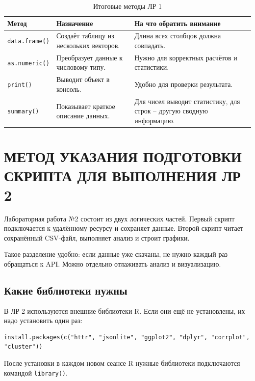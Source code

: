 \documentclass[14pt,a4paper]{extarticle}
\begin{document}
\begin{table}[H]
\caption{Итоговые методы ЛР 1}
\begin{tabularx}{\textwidth}{|l|Y|Y|}
\hline
\textbf{Метод} & \textbf{Назначение} & \textbf{На что обратить внимание} \\
\hline
\texttt{data.frame()} & Создаёт таблицу из нескольких векторов. & Длина всех столбцов должна совпадать. \\
\hline
\texttt{as.numeric()} & Преобразует данные к числовому типу. & Нужно для корректных расчётов и статистики. \\
\hline
\texttt{print()} & Выводит объект в консоль. & Удобно для проверки результата. \\
\hline
\texttt{summary()} & Показывает краткое описание данных. & Для чисел выводит статистику, для строк -- другую сводную информацию. \\
\hline
\end{tabularx}
\end{table}

\newpage

\section{МЕТОД УКАЗАНИЯ ПОДГОТОВКИ СКРИПТА ДЛЯ ВЫПОЛНЕНИЯ ЛР 2}

Лабораторная работа №2 состоит из двух логических частей. Первый скрипт подключается к удалённому ресурсу и сохраняет данные. Второй скрипт читает сохранённый CSV-файл, выполняет анализ и строит графики.

Такое разделение удобно: если данные уже скачаны, не нужно каждый раз обращаться к API. Можно отдельно отлаживать анализ и визуализацию.

\subsection{Какие библиотеки нужны}

В ЛР 2 используются внешние библиотеки R. Если они ещё не установлены, их надо установить один раз:

\begin{lstlisting}
install.packages(c("httr", "jsonlite", "ggplot2", "dplyr", "corrplot", "cluster"))
\end{lstlisting}

После установки в каждом новом сеансе R нужные библиотеки подключаются командой \texttt{library()}.
\end{document}

